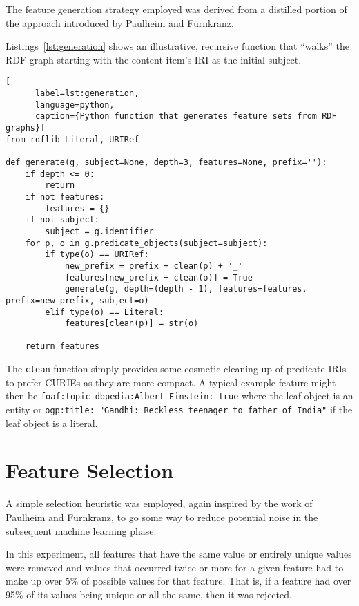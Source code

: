 The feature generation strategy employed was derived from a distilled
portion of the approach introduced by Paulheim
and F\"urnkranz\cite{paulheim2012unsupervised}.

Listings~\ref{lst:generation} shows an illustrative, recursive
function that ``walks'' the RDF graph starting with the content
item's IRI as the initial subject.

\begin{centering}
  \begin{lstlisting}[
      label=lst:generation,
      language=python,
      caption={Python function that generates feature sets from RDF graphs}]
from rdflib Literal, URIRef
    
def generate(g, subject=None, depth=3, features=None, prefix=''):
    if depth <= 0:
        return
    if not features:
        features = {}
    if not subject:
        subject = g.identifier
    for p, o in g.predicate_objects(subject=subject):
        if type(o) == URIRef:
            new_prefix = prefix + clean(p) + '_'
            features[new_prefix + clean(o)] = True
            generate(g, depth=(depth - 1), features=features, prefix=new_prefix, subject=o)
        elif type(o) == Literal:
            features[clean(p)] = str(o)

    return features
  \end{lstlisting}
\end{centering}

The \texttt{clean} function simply provides some cosmetic cleaning
up of predicate IRIs to prefer CURIEs as they are more compact. A
typical example feature might then be
\texttt{foaf:topic\_dbpedia:Albert\_Einstein: true} where the leaf
object is an entity or
\texttt{ogp:title: "Gandhi: Reckless teenager to father of India"} if
the leaf object is a literal.

\section{Feature Selection}

A simple selection heuristic was employed, again inspired by the work
of Paulheim and F\"urnkranz\cite{paulheim2012unsupervised}, to go
some way to reduce potential noise in the subsequent machine learning
phase.

In this experiment, all features that have the same value or entirely
unique values were removed and values that occurred twice or more
for a given feature had to make up over 5\% of possible values for
that feature. That is, if a feature had over 95\% of its values being
unique or all the same, then it was rejected.

